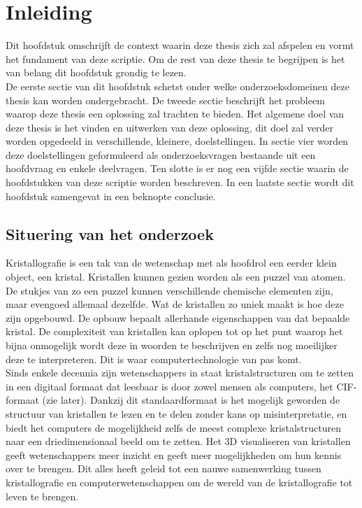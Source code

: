 

\chapter{Inleiding}
Dit hoofdstuk omschrijft de context waarin deze thesis zich zal afspelen en vormt het fundament van deze scriptie. Om de rest van deze thesis te begrijpen is het van belang dit hoofdstuk grondig te lezen. 
\\
De eerste sectie van dit hoofdstuk schetst onder welke onderzoeksdomeinen deze thesis kan worden ondergebracht. De tweede sectie beschrijft het probleem waarop deze thesis een oplossing zal trachten te bieden. Het algemene doel van deze thesis is het vinden en uitwerken van deze oplossing, dit doel zal verder worden opgedeeld in verschillende, kleinere, doelstellingen. In sectie vier worden deze doelstellingen geformuleerd als onderzoeksvragen  bestaande uit een hoofdvraag en enkele deelvragen. Ten slotte is er nog een vijfde sectie waarin de hoofdstukken van deze scriptie worden beschreven. In een laatste sectie wordt dit hoofdstuk samengevat in een beknopte conclusie.

\section{Situering van het onderzoek}
Kristallografie is een tak van de wetenschap met als hoofdrol een eerder klein object, een kristal. Kristallen kunnen gezien worden als een puzzel van atomen. De stukjes van zo een puzzel kunnen verschillende chemische elementen zijn, maar evengoed allemaal dezelfde. Wat de kristallen zo uniek maakt is hoe deze zijn opgebouwd. De opbouw bepaalt allerhande eigenschappen van dat bepaalde kristal. De complexiteit van kristallen kan oplopen tot op het punt waarop het bijna onmogelijk wordt deze in woorden te beschrijven en zelfs nog moeilijker deze te interpreteren. Dit is waar computertechnologie van pas komt. 
\\
Sinds enkele decennia zijn wetenschappers in staat kristalstructuren om te zetten in een digitaal formaat dat leesbaar is door zowel mensen als computers, het CIF-formaat (zie later). Dankzij dit standaardformaat is het mogelijk geworden de structuur van kristallen te lezen en te delen zonder kans op misinterpretatie, en biedt het computers de mogelijkheid zelfs de meest complexe kristalstructuren naar een driedimensionaal beeld om te zetten. Het 3D visualiseren van kristallen geeft wetenschappers meer inzicht en geeft meer mogelijkheden om hun kennis over te brengen. Dit alles heeft geleid tot een nauwe samenwerking tussen kristallografie en computerwetenschappen om de wereld van de kristallografie tot leven te brengen.


